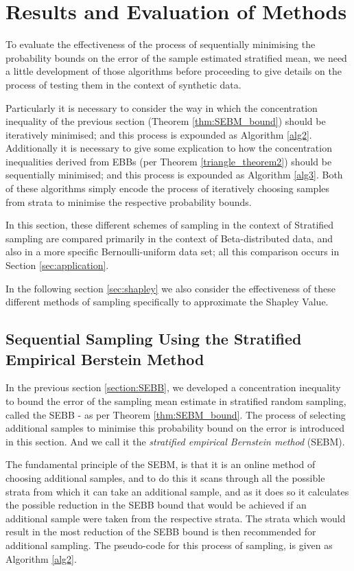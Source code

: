 \section{Results and Evaluation of Methods}\label{section:statistics_results}

To evaluate the effectiveness of the process of sequentially minimising the probability bounds on the error of the sample estimated stratified mean, we need a little development of those algorithms before proceeding to give details on the process of testing them in the context of synthetic data.

Particularly it is necessary to consider the way in which the concentration inequality of the previous section (Theorem \ref{thm:SEBM_bound}) should be iteratively minimised; and this process is expounded as Algorithm \ref{alg2}.
Additionally it is necessary to give some explication to how the concentration inequalities derived from EBBs (per Theorem \ref{triangle_theorem2}) should be sequentially minimised; and this process is expounded as Algorithm \ref{alg3}. Both of these algorithms simply encode the process of iteratively choosing samples from strata to minimise the respective probability bounds.

In this section, these different schemes of sampling in the context of Stratified sampling are compared primarily in the context of Beta-distributed data, and also in a more specific Bernoulli-uniform data set; all this comparison occurs in Section \ref{sec:application}.

In the following section \ref{sec:shapley} we also consider the effectiveness of these different methods of sampling specifically to approximate the Shapley Value.

\subsection{Sequential Sampling Using the Stratified Empirical Berstein Method} \label{sec:SEBMalgorithm}
In the previous section \ref{section:SEBB}, we developed a concentration inequality to bound the error of the sampling mean estimate in stratified random sampling, called the SEBB - as per Theorem \ref{thm:SEBM_bound}.
The process of selecting additional samples to minimise this probability bound on the error is introduced in this section. And we call it the \textit{stratified empirical Bernstein method} (SEBM).

The fundamental principle of the SEBM, is that it is an online method of choosing additional samples, and to do this it scans through all the possible strata from which it can take an additional sample, and as it does so it calculates the possible reduction in the SEBB bound that would be achieved if an additional sample were taken from the respective strata.
The strata which would result in the most reduction of the SEBB bound is then recommended for additional sampling.
The pseudo-code for this process of sampling, is given as Algorithm \ref{alg2}.



